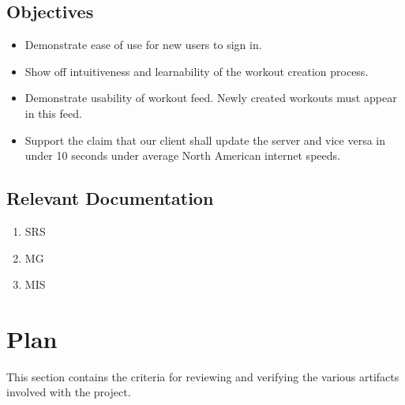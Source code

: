 \documentclass[12pt, titlepage]{article}
\begin{document}
	\subsection{Objectives}
	

		\begin{itemize}
			\item Demonstrate ease of use for new users to sign in.
			\item Show off intuitiveness and learnability of the workout creation process.
			\item Demonstrate usability of workout feed. Newly created workouts must appear in this feed.
			\item Support the claim that our client shall update the server and vice versa in under 10 seconds under average North American internet speeds.
		\end{itemize}

	\subsection{Relevant Documentation}

	\begin{enumerate}
		\item SRS
		\item MG
		\item MIS
	\end{enumerate}
	
	
	\section{Plan}

	This section contains the criteria for reviewing and verifying the various artifacts involved with the project.
	
	
\end{document}
